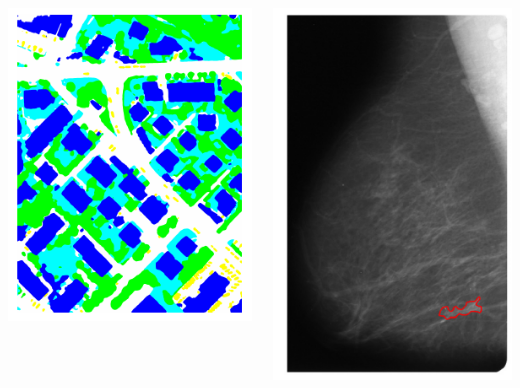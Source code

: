 \documentclass{beamer}
\begin{document}
\begin{frame}
\begin{columns}
\begin{center}
\includegraphics[scale=0.3]{aerialgt.png}
\end{center}
\begin{center}
\includegraphics[scale=0.3]{mama.png}
\end{center}
\end{columns}


\end{frame}

\end{document}
